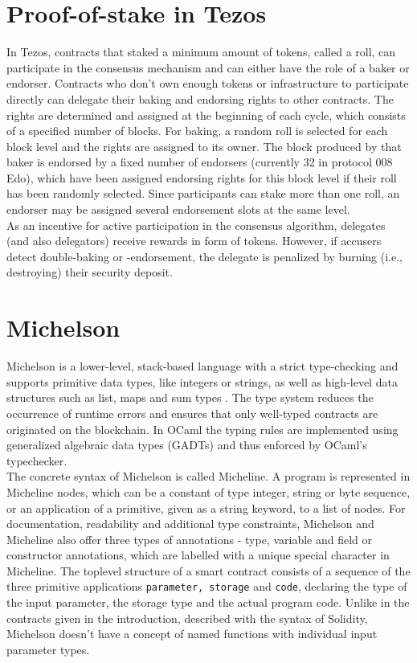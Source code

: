 \section{Proof-of-stake in Tezos}
In Tezos, contracts that staked a minimum amount of tokens, called a roll, can participate in the consensus mechanism and can either have the role of a baker or endorser. Contracts who don't own enough tokens or infrastructure to participate directly can delegate their baking and endorsing rights to other contracts. The rights are determined and assigned at the beginning of each cycle, which consists of a specified number of blocks. For baking, a random roll is selected for each block level and the rights are assigned to its owner. The block produced by that baker is endorsed by a fixed number of endorsers (currently 32 in protocol 008 Edo), which have been assigned endorsing rights for this block level if their roll has been randomly selected. Since participants can stake more than one roll, an endorser may be assigned several endorsement slots at the same level. \\
As an incentive for active participation in the consensus algorithm, delegates (and also delegators) receive rewards in form of tokens. However, if accusers detect double-baking or -endorsement, the delegate is penalized by burning (i.e., destroying) their security deposit. \cite{tezos_docs}

\section{Michelson}
Michelson is a lower-level, stack-based language with a strict type-checking and supports primitive data types, like integers or strings, as well as high-level data structures such as list, maps and sum types \cite{tezos_docs}. The type system reduces the occurrence of runtime errors and ensures that only well-typed contracts are originated on the blockchain. In OCaml the typing rules are implemented using generalized algebraic data types (GADTs) \cite{tezos_docs} and thus enforced by OCaml's typechecker. \\
The concrete syntax of Michelson is called Micheline. A program is represented in Micheline nodes, which can be a constant of type integer, string or byte sequence, or an application of a primitive, given as a string keyword, to a list of nodes. For documentation, readability and additional type constraints, Michelson and Micheline also offer three types of annotations - type, variable and field or constructor annotations, which are labelled with a unique special character in Micheline. The toplevel structure of a smart contract consists of a sequence of the three primitive applications \texttt{parameter, storage} and \texttt{code}, declaring the type of the input parameter, the storage type and the actual program code. Unlike in the contracts given in the introduction, described with the syntax of Solidity, Michelson doesn't have a concept of named functions with individual input parameter types. 

